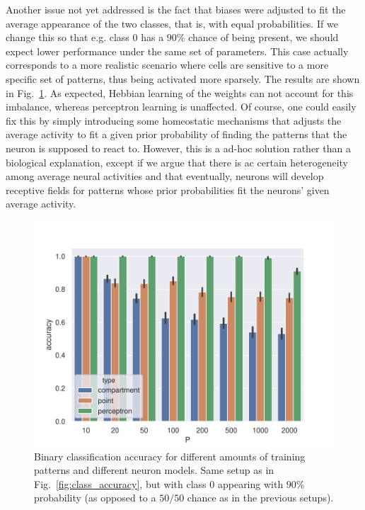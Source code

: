 \documentclass[10pt,a4paper]{article}
\begin{document}
Another issue not yet addressed is the fact that biases were adjusted to fit the average appearance of the two classes, that is, with equal probabilities. If we change this so that e.g. class $0$ has a $90\%$ chance of being present, we should expect lower performance under the same set of parameters. This case actually corresponds to a more realistic scenario where cells are sensitive to a more specific set of patterns, thus being activated more sparsely. The results are shown in Fig.~\ref{fig:class_accuracy_imbalance}. As expected, Hebbian learning of the weights can not account for this imbalance, whereas perceptron learning is unaffected. Of course, one could easily fix this by simply introducing some homeostatic mechanisms that adjusts the average activity to fit a given prior probability of finding the patterns that the neuron is supposed to react to. However, this is a ad-hoc solution rather than a biological explanation, except if we argue that there is ac certain heterogeneity among average neural activities and that eventually, neurons will develop receptive fields for patterns whose prior probabilities fit the neurons' given average activity.

\begin{figure}
	\includegraphics[width=\textwidth]{./figures/accuracy_pattern_number_class_imbalance.pdf}
	\caption{Binary classification accuracy for different amounts of training patterns and different neuron models. Same setup as in Fig.~\ref{fig:class_accuracy}, but with class $0$ appearing with $90\%$ probability (as opposed to a $50/50$ chance as in the previous setups).}
	\label{fig:class_accuracy_imbalance}
\end{figure}
\end{document}
